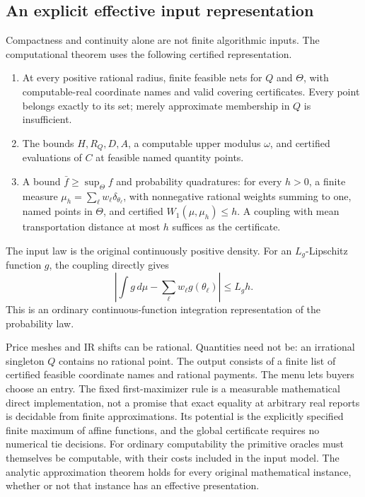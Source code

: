 \documentclass[11pt,a4paper]{article}
\numberwithin{equation}{section}
\begin{document}
\subsection{An explicit effective input representation}
Compactness and continuity alone are not finite algorithmic inputs.
The computational theorem uses the following certified representation.
\begin{enumerate}
\item At every positive rational radius, finite feasible nets for
  \(Q\) and \(\Theta\), with computable-real coordinate names and valid
  covering certificates. Every point belongs exactly to its set;
  merely approximate membership in \(Q\) is insufficient.
\item The bounds \(H,R_Q,D,A\), a computable upper modulus \(\omega\),
  and certified evaluations of \(C\) at feasible named quantity points.
\item A bound \(\bar f\ge\sup_\Theta f\) and probability quadratures:
  for every \(h>0\), a finite measure
  \(\mu_h=\sum_\ell w_\ell\delta_{\theta_\ell}\), with nonnegative
  rational weights summing to one, named points in \(\Theta\), and
  certified \(W_1(\mu,\mu_h)\le h\). A coupling with mean transportation
  distance at most \(h\) suffices as the certificate.
\end{enumerate}
The input law is the original continuously positive density.
For an \(L_g\)-Lipschitz function \(g\), the coupling directly gives
\begin{equation}\label{eq:quadrature}
 \left|\int g\,d\mu-\sum_\ell w_\ell g(\theta_\ell)\right|\le L_gh.
\end{equation}
This is an ordinary continuous-function integration representation of
the probability law.

Price meshes and IR shifts can be rational. Quantities need not be:
an irrational singleton \(Q\) contains no rational point.
The output consists of a finite list of certified feasible coordinate
names and rational payments. The menu lets buyers choose an entry.
The fixed first-maximizer rule is a measurable mathematical direct
implementation, not a promise that exact equality at arbitrary real
reports is decidable from finite approximations.
Its potential is the explicitly specified finite maximum of affine
functions, and the global certificate requires no numerical tie decisions.
For ordinary computability the primitive oracles must themselves be
computable, with their costs included in the input model.
The analytic approximation theorem holds for every original mathematical
instance, whether or not that instance has an effective presentation.
\end{document}
